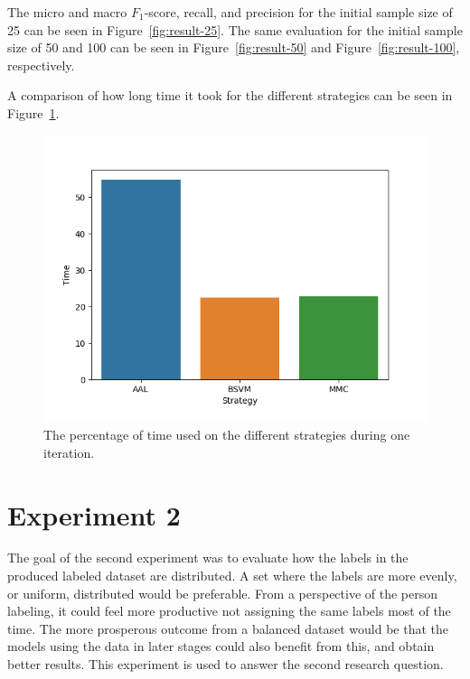 The micro and macro $F_1$-score, recall, and precision for the initial sample size of 25 can be seen in Figure~\ref{fig:result-25}.
The same evaluation for the initial sample size of 50 and 100 can be seen in Figure~\ref{fig:result-50} and Figure~\ref{fig:result-100}, respectively.


A comparison of how long time it took for the different strategies can be seen in Figure~\ref{fig:al-time-dist}.

\begin{figure}[!ht]
    \centering
    \includegraphics[width=\textwidth]{figures/time-distribution.png}
    \caption{The percentage of time used on the different strategies during one iteration.}
    \label{fig:al-time-dist}
\end{figure}

\section{Experiment 2}

The goal of the second experiment was to evaluate how the labels in the produced labeled dataset are distributed.
A set where the labels are more evenly, or uniform, distributed would be preferable.
From a perspective of the person labeling, it could feel more productive not assigning the same labels most of the time.
The more prosperous outcome from a balanced dataset would be that the models using the data in later stages could also benefit from this, and obtain better results.
This experiment is used to answer the second research question.

